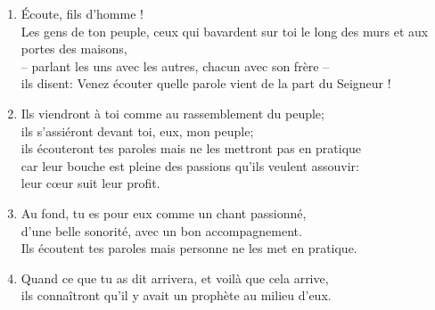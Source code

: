 \documentclass[12pt,a4paper,titlepage]{article}
\def \pslabelsep{0.2em} %
\def \psleftmargin{0em} %
\begin{document}
\begin{enumerate}[leftmargin=\psleftmargin, labelsep = \pslabelsep, label={\arabic*}, font=\color{\pscolor}\small\textsuperscript, parsep=0em, itemsep=0em, topsep=0em ]
\item Écoute, fils d’homme ! \\ Les gens de ton peuple, ceux qui bavardent sur toi le long des murs et aux portes des maisons, \\– parlant les uns avec les autres, chacun avec son frère – \\ ils disent: \og{}Venez écouter quelle parole vient de la part du Seigneur !\fg{} \verseSpace
\item Ils viendront à toi comme au rassemblement du peuple; \\ ils s’assiéront devant toi, eux, mon peuple; \\ ils écouteront tes paroles mais ne les mettront pas en pratique \\ car leur bouche est pleine des passions qu’ils veulent assouvir: \\ leur cœur suit leur profit. \verseSpace
\item Au fond, tu es pour eux comme un chant passionné, \\ d’une belle sonorité, avec un bon accompagnement. \\ Ils écoutent tes paroles mais personne ne les met en pratique. \verseSpace
\item Quand ce que tu as dit arrivera, et voilà que cela arrive,\\ ils connaîtront qu’il y avait un prophète au milieu d’eux.




\end{enumerate}
\end{document}
